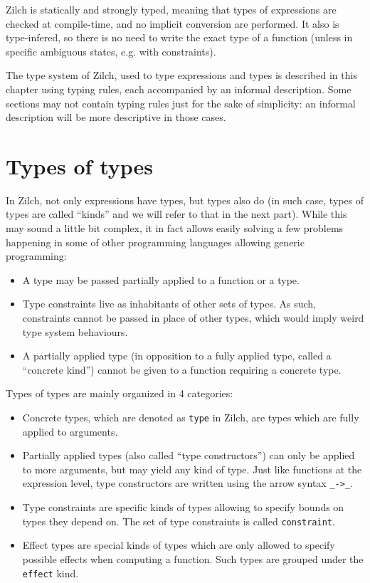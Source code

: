 Zilch is statically and strongly typed, meaning that types of expressions are checked at compile-time, and no implicit conversion are performed.
It also is type-infered, so there is no need to write the exact type of a function (unless in specific ambiguous states, e.g. with constraints).

The type system of Zilch, used to type expressions and types is described in this chapter using typing rules, each accompanied by an informal description.
Some sections may not contain typing rules just for the sake of simplicity: an informal description will be more descriptive in those cases.

\section{Types of types}\label{sec:zilch-staticsem-types}

In Zilch, not only expressions have types, but types also do (in such case, types of types are called “kinds” and we will refer to that in the next part).
While this may sound a little bit complex, it in fact allows easily solving a few problems happening in some of other programming languages allowing generic programming:
\begin{itemize}
	\item A type may be passed partially applied to a function or a type.
	\item Type constraints live as inhabitants of other sets of types.
	      As such, constraints cannot be passed in place of other types, which would imply weird type system behaviours.
	\item A partially applied type (in opposition to a fully applied type, called a ``concrete kind'') cannot be given to a function requiring a concrete type.
\end{itemize}

Types of types are mainly organized in 4 categories:
\begin{itemize}
	\item Concrete types, which are denoted as \verb|type| in Zilch, are types which are fully applied to arguments.
	\item Partially applied types (also called ``type constructors'') can only be applied to more arguments, but may yield any kind of type.
	      Just like functions at the expression level, type constructors are written using the arrow syntax \verb|_->_|.
	\item Type constraints are specific kinds of types allowing to specify bounds on types they depend on.
	      The set of type constraints is called \verb|constraint|.
	\item Effect types are special kinds of types which are only allowed to specify possible effects when computing a function.
	      Such types are grouped under the \verb|effect| kind.
\end{itemize}

